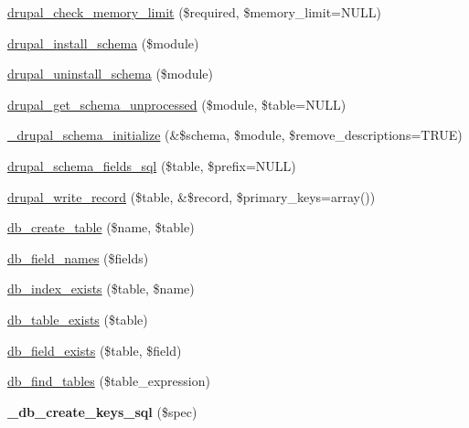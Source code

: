 \begin{DoxyCompactItemize}
\hyperlink{group__schemaapi_gad3a1c91d672f6e9cf9be66557db148fe}{drupal\_\-check\_\-memory\_\-limit} (\$required, \$memory\_\-limit=NULL)
\item 
\hyperlink{group__schemaapi_ga9706b8d6ecdac10302d83bd50935a698}{drupal\_\-install\_\-schema} (\$module)
\item 
\hyperlink{group__schemaapi_ga0688b6627af9dc05f2618f81489c3db0}{drupal\_\-uninstall\_\-schema} (\$module)
\item 
\hyperlink{group__schemaapi_gaecb0d63f03b96dd1426298804e091d3b}{drupal\_\-get\_\-schema\_\-unprocessed} (\$module, \$table=NULL)
\item 
\hyperlink{group__schemaapi_gad4ce891e1e944b1d6eee7253448a0178}{\_\-drupal\_\-schema\_\-initialize} (\&\$schema, \$module, \$remove\_\-descriptions=TRUE)
\item 
\hyperlink{group__schemaapi_gaacfcd6f676ee9062f0ba50a008a05443}{drupal\_\-schema\_\-fields\_\-sql} (\$table, \$prefix=NULL)
\item 
\hyperlink{group__schemaapi_ga96f707de751a962bf21b6cb0cb4f2ae6}{drupal\_\-write\_\-record} (\$table, \&\$record, \$primary\_\-keys=array())
\item 
\hyperlink{group__schemaapi_gaf3a8307693d6b28374665c72531b429f}{db\_\-create\_\-table} (\$name, \$table)
\item 
\hyperlink{group__schemaapi_gaeb423ba53e5133548abe3d999f86e787}{db\_\-field\_\-names} (\$fields)
\item 
\hyperlink{group__schemaapi_ga0c10c365922d538e4d5d17fb314d4b79}{db\_\-index\_\-exists} (\$table, \$name)
\item 
\hyperlink{group__schemaapi_ga78809300cee80db034832825aed55b70}{db\_\-table\_\-exists} (\$table)
\item 
\hyperlink{group__schemaapi_ga6b39d7c0876ab53b1588ff9e40677c42}{db\_\-field\_\-exists} (\$table, \$field)
\item 
\hyperlink{group__schemaapi_gac723bfddd5f133eb4d3dcec84c3c3f3c}{db\_\-find\_\-tables} (\$table\_\-expression)
\item 
\hypertarget{group__schemaapi_gaa4be538758cb8279d3aeed18e1b25c2d}{
{\bfseries \_\-db\_\-create\_\-keys\_\-sql} (\$spec)}
\label{group__schemaapi_gaa4be538758cb8279d3aeed18e1b25c2d}


\end{DoxyCompactItemize}
